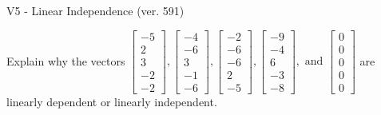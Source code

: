 \begin{exercise}
  \begin{exerciseTitle}V5 - Linear Independence (ver. 591)\end{exerciseTitle}
  \begin{exerciseStatement}
    Explain why the vectors \(\left[\begin{array}{r}
-5 \\
2 \\
3 \\
-2 \\
-2
\end{array}\right] , \left[\begin{array}{r}
-4 \\
-6 \\
3 \\
-1 \\
-6
\end{array}\right] , \left[\begin{array}{r}
-2 \\
-6 \\
-6 \\
2 \\
-5
\end{array}\right] , \left[\begin{array}{r}
-9 \\
-4 \\
6 \\
-3 \\
-8
\end{array}\right] , \text{ and } \left[\begin{array}{r}
0 \\
0 \\
0 \\
0 \\
0
\end{array}\right]\) are linearly dependent or linearly independent.	



\end{exerciseStatement}
\end{exercise}
